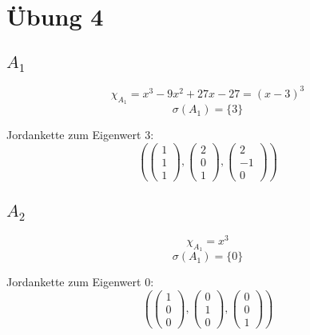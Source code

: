 \documentclass[10pt,a4paper]{article}
\begin{document}
\section*{Übung 4}

\subsection*{$A_{1}$}

\begin{equation}
\chi_{A_{1}} = x^{3} - 9x^{2} + 27x - 27 = (x - 3)^{3}
\end{equation}
\begin{equation}
\sigma(A_{1}) = \{3\}
\end{equation}

Jordankette zum Eigenwert $3$:
\begin{equation}
\left(
\begin{pmatrix}
1\\1\\1
\end{pmatrix},
\begin{pmatrix}
2\\0\\1
\end{pmatrix},
\begin{pmatrix}
2\\-1\\0
\end{pmatrix}
\right)
\end{equation}

\subsection*{$A_{2}$}

\begin{equation}
\chi_{A_{1}} = x^{3}
\end{equation}
\begin{equation}
\sigma(A_{1}) = \{0\}
\end{equation}

Jordankette zum Eigenwert $0$:
\begin{equation}
\left(
\begin{pmatrix}
1\\0\\0
\end{pmatrix},
\begin{pmatrix}
0\\1\\0
\end{pmatrix},
\begin{pmatrix}
0\\0\\1
\end{pmatrix}
\right)
\end{equation}
\end{document}
